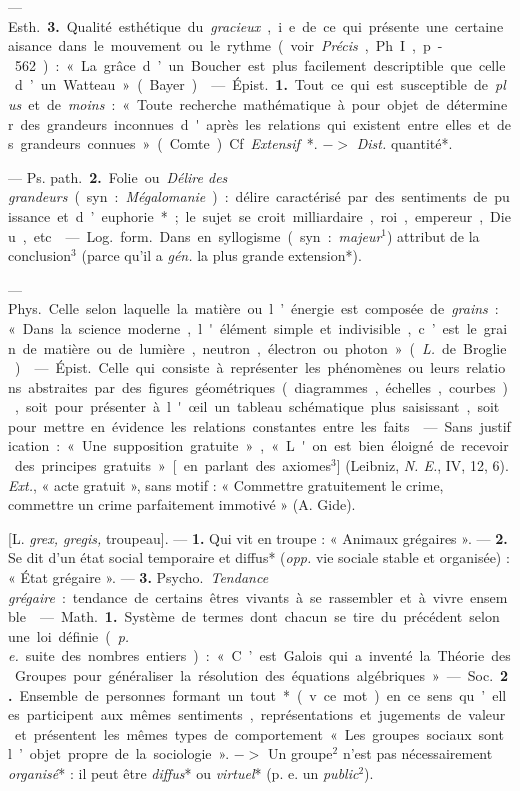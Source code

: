 \begin{itemize}[leftmargin=1cm, label=, itemsep=1pt]
— \si{Esth.} {\bf 3.} Qualité esthétique du {\it gracieux}, i. e. de ce qui
présente une certaine aisance dans le mouvement ou le rythme (voir
{\it Précis}, Ph. I, p- 562) : « La grâce d’un Boucher est plus facilement
descriptible que celle d’un Watteau » (Bayer).

 — \si{Épist.} {\bf 1.} Tout ce qui est susceptible de
{\it plus} et de {\it moins} : « Toute recherche mathématique à pour objet de
déterminer des grandeurs inconnues d'après les relations qui existent entre
elles et des grandeurs connues » (Comte). Cf. {\it Extensif}*.
$->$ {\it Dist.} quantité*.

— \si{Ps. path.} {\bf 2.} Folie ou {\it Délire des grandeurs} (syn. :
{\it Mégalomanie}) : délire caractérisé par des sentiments de puissance et
d’euphorie* ; le sujet se croit milliardaire, roi, empereur, Dieu, etc.

 — \si{Log.} \si{form.} Dans en syllogisme (syn. :
{\it majeur}$^1$) attribut de la conclusion$^3$ (parce qu'il a {\it gén.}
la plus grande extension*).

 — \si{Phys.} Celle selon laquelle la matière ou
l’énergie est composée de {\it grains} : « Dans la science moderne,
l'élément simple et indivisible, c’est le grain de matière ou de lumière,
neutron, électron ou photon » ({\it L.} de Broglie).

 — \si{Épist.} Celle qui consiste à représenter les phénomènes ou leurs relations abstraites par des figures géométriques 
(diagrammes, échelles, courbes), soit pour présenter à l'œil un tableau
schématique plus saisissant, soit pour mettre en évidence les relations
constantes entre les faits.

 — Sans justification : « Une supposition gratuite », « L'on est
bien éloigné de recevoir des principes gratuits » [en parlant des axiomes$^3$]
(Leibniz, {\it N. E.}, IV, 12, 6). {\it Ext.}, « acte gratuit », sans motif :
« Commettre gratuitement le crime, commettre un crime parfaitement
immotivé » (A. Gide).

 [L. {\it grex, gregis,} troupeau]. — {\bf 1.} Qui vit en
troupe : « Animaux grégaires ». — {\bf 2.} Se dit d’un état social temporaire
et diffus* ({\it opp.} vie sociale stable et organisée) : « État grégaire ».
— {\bf 3.} \si{Psycho.} {\it Tendance grégaire} : tendance de certains êtres
vivants à se rassembler et à vivre ensemble.

 — \si{Math.} {\bf 1.} Système de termes dont chacun se tire du
précédent selon une loi définie ({\it p. e.} suite des nombres entiers) :
« C’est Galois qui a inventé la Théorie des Groupes pour généraliser la
résolution des équations algébriques. » — \si{Soc.} {\bf 2.} Ensemble de
personnes formant un tout* (v. ce mot) en ce sens qu’elles participent aux
mêmes sentiments, représentations et jugements de valeur et présentent les
mêmes types de comportement « Les groupes sociaux sont l’objet propre de la
sociologie ». $->$ Un groupe$^2$ n'est pas nécessairement {\it organisé}* :
il peut être {\it diffus}* ou {\it virtuel}* (p. e. un {\it public}$^2$).


\end{itemize}
